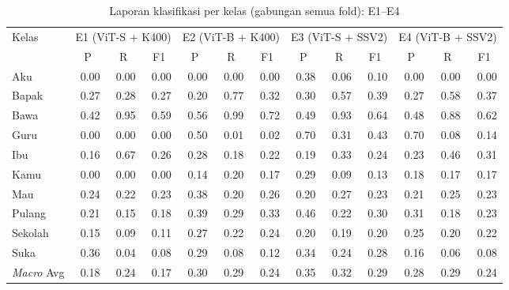 \begin{table}[H]
\centering
\caption{Laporan klasifikasi per kelas (gabungan semua fold): E1--E4}
\label{tab:4.s1_perkelas}
{\setlength{\tabcolsep}{3pt}
\footnotesize
\begin{tabular}{|l|rrr|rrr|rrr|rrr|}
\hline
\multirow{2}{*}{Kelas} &
  \multicolumn{3}{c|}{E1 (ViT-S + K400)} &
  \multicolumn{3}{c|}{E2 (ViT-B + K400)} &
  \multicolumn{3}{c|}{E3 (ViT-S + SSV2)} &
  \multicolumn{3}{c|}{E4 (ViT-B + SSV2)} \\
\cline{2-13}
 & \multicolumn{1}{c|}{P} & \multicolumn{1}{c|}{R} & \multicolumn{1}{c|}{F1} & \multicolumn{1}{c|}{P} & \multicolumn{1}{c|}{R} & \multicolumn{1}{c|}{F1} & \multicolumn{1}{c|}{P} & \multicolumn{1}{c|}{R} & \multicolumn{1}{c|}{F1} & \multicolumn{1}{c|}{P} & \multicolumn{1}{c|}{R} & \multicolumn{1}{c|}{F1} \\
\hline
Aku     & 0.00 & 0.00 & 0.00 & 0.00 & 0.00 & 0.00 & 0.38 & 0.06 & 0.10 & 0.00 & 0.00 & 0.00 \\
Bapak   & 0.27 & 0.28 & 0.27 & 0.20 & 0.77 & 0.32 & 0.30 & 0.57 & 0.39 & 0.27 & 0.58 & 0.37 \\
Bawa    & 0.42 & 0.95 & 0.59 & 0.56 & 0.99 & 0.72 & 0.49 & 0.93 & 0.64 & 0.48 & 0.88 & 0.62 \\
Guru    & 0.00 & 0.00 & 0.00 & 0.50 & 0.01 & 0.02 & 0.70 & 0.31 & 0.43 & 0.70 & 0.08 & 0.14 \\
Ibu     & 0.16 & 0.67 & 0.26 & 0.28 & 0.18 & 0.22 & 0.19 & 0.33 & 0.24 & 0.23 & 0.46 & 0.31 \\
Kamu    & 0.00 & 0.00 & 0.00 & 0.14 & 0.20 & 0.17 & 0.29 & 0.09 & 0.13 & 0.18 & 0.17 & 0.17 \\
Mau     & 0.24 & 0.22 & 0.23 & 0.38 & 0.20 & 0.26 & 0.20 & 0.27 & 0.23 & 0.21 & 0.25 & 0.23 \\
Pulang  & 0.21 & 0.15 & 0.18 & 0.39 & 0.29 & 0.33 & 0.46 & 0.22 & 0.30 & 0.31 & 0.18 & 0.23 \\
Sekolah & 0.15 & 0.09 & 0.11 & 0.27 & 0.22 & 0.24 & 0.20 & 0.19 & 0.20 & 0.25 & 0.20 & 0.22 \\
Suka    & 0.36 & 0.04 & 0.08 & 0.29 & 0.08 & 0.12 & 0.34 & 0.24 & 0.28 & 0.16 & 0.06 & 0.08 \\
\hline
\textit{Macro} Avg & 0.18 & 0.24 & 0.17 & 0.30 & 0.29 & 0.24 & 0.35 & 0.32 & 0.29 & 0.28 & 0.29 & 0.24 \\
\hline
\end{tabular}
}
\end{table}

